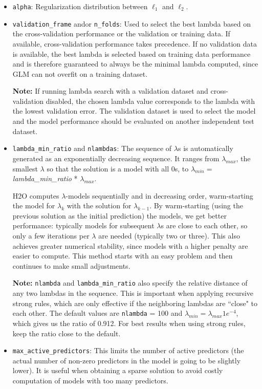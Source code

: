 \begin{itemize}
\item \texttt{alpha}: Regularization distribution between  $\ell_1$ and  $\ell_2$.
\item \texttt{validation\_frame} and\/or \texttt{n\_folds}: Used to select the best lambda based on the cross-validation performance  or the validation or training data. If available, cross-validation performance takes precedence. If no validation data is available, the best lambda is selected based on training data performance and is therefore guaranteed to always be the minimal lambda computed, since GLM can not overfit on a training dataset.
 
\textbf{Note:} If running lambda search with a validation dataset and cross-validation disabled, the chosen lambda value corresponds to the lambda with the lowest validation error. The validation dataset is used to select the model and the model performance should be evaluated on another independent test dataset. 

\item \texttt{lambda\_min\_ratio} and \texttt{nlambdas}: The sequence of $\lambda$s is automatically generated as an exponentially decreasing sequence. It ranges from $\lambda_{max}$,
the smallest $\lambda$ so that the solution is a model with all 0s, to $\lambda_{min} =
$ \textit{lambda\_min\_ratio} * $ \lambda_{max}$.

H2O computes $\lambda$-models sequentially and in decreasing order, warm-starting the model for $\lambda_k$ with the solution for $\lambda_{k-1}$. By warm-starting (using the previous solution as the initial prediction) the models, we get better performance: typically models for subsequent $\lambda$s are close to each other, so only a few iterations per $\lambda$ are needed (typically two or three). This also achieves greater numerical stability, since models with a higher penalty are easier to compute. This method starts with an easy problem and then continues to make small adjustments. 

\textbf{Note:} \texttt{nlambda} and \texttt{lambda\_min\_ratio} also specify the relative distance of any two
 lambdas in the sequence. This is important when applying recursive strong rules, which are only effective if the neighboring lambdas are ``close" to each other. The default values are \texttt{nlambda} = 100 and $\lambda_{min}
= \lambda_{max} 1e^{-4}$, which gives us the ratio of 0.912.  For best results when using strong rules, keep the
ratio close to the default.

\item \texttt{max\_active\_predictors}: This limits the number of active predictors (the actual number of non-zero predictors in the model is going to be slightly lower). It is useful when obtaining a sparse solution to avoid costly computation of models with too many predictors.

\end{itemize}

